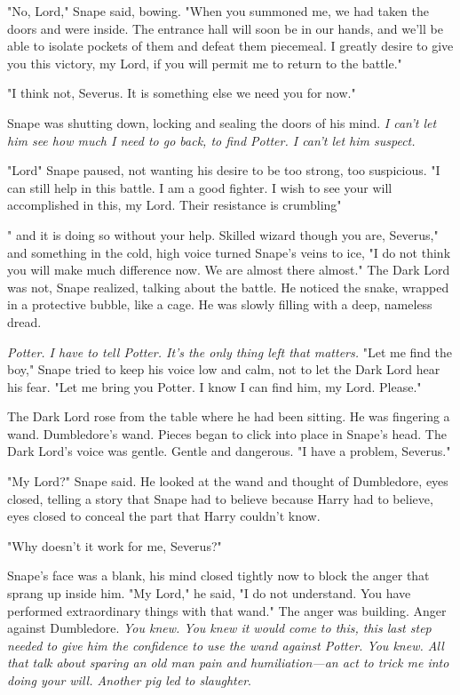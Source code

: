 "No, Lord," Snape said, bowing. "When you summoned me, we had taken the doors and were inside. The entrance hall will soon be in our hands, and we'll be able to isolate pockets of them and defeat them piecemeal. I greatly desire to give you this victory, my Lord, if you will permit me to return to the battle."

"I think not, Severus. It is something else we need you for now."

Snape was shutting down, locking and sealing the doors of his mind. \emph{I can't let him see how much I need to go back, to find Potter. I can't let him suspect.}

"Lord{\el}" Snape paused, not wanting his desire to be too strong, too suspicious. "I can still help in this battle. I am a good fighter. I wish to see your will accomplished in this, my Lord. Their resistance is crumbling{\el}"

"{\el} and it is doing so without your help. Skilled wizard though you are, Severus," and something in the cold, high voice turned Snape's veins to ice, "I do not think you will make much difference now. We are almost there{\el} almost." The Dark Lord was not, Snape realized, talking about the battle. He noticed the snake, wrapped in a protective bubble, like a cage. He was slowly filling with a deep, nameless dread.

\emph{Potter. I have to tell Potter. It's the only thing left that matters.} "Let me find the boy," Snape tried to keep his voice low and calm, not to let the Dark Lord hear his fear. "Let me bring you Potter. I know I can find him, my Lord. Please."

The Dark Lord rose from the table where he had been sitting. He was fingering a wand. Dumbledore's wand. Pieces began to click into place in Snape's head. The Dark Lord's voice was gentle. Gentle and dangerous. "I have a problem, Severus."

"My Lord?" Snape said. He looked at the wand and thought of Dumbledore, eyes closed, telling a story that Snape had to believe because Harry had to believe, eyes closed to conceal the part that Harry couldn't know.

"Why doesn't it work for me, Severus?"

Snape's face was a blank, his mind closed tightly now to block the anger that sprang up inside him. "My Lord," he said, "I do not understand. You{\el} have performed extraordinary things with that wand." The anger was building. Anger against Dumbledore. \emph{You knew. You knew it would come to this, this last step needed to give him the confidence to use the wand against Potter. You knew. All that talk about sparing an old man pain and humiliation—an act to trick me into doing your will. Another pig led to slaughter}.

